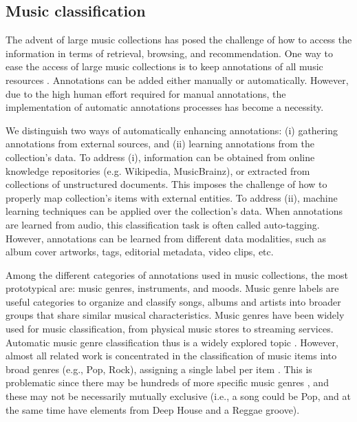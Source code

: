 \subsection{Music classification}
\label{sec:intro:annotation}

The advent of large music collections has posed the challenge of how to access the information in terms of retrieval, browsing, and recommendation. One way to ease the access of large music collections is to keep annotations of all music resources \citep{sordo2012semantic}. Annotations can be added either manually or automatically. 
However, due to the high human effort required for manual annotations, the implementation of automatic annotations processes has become a necessity. 

We distinguish two ways of automatically enhancing annotations: (i) gathering annotations from external sources, and (ii) learning annotations from the collection's data. To address (i), information can be obtained from online knowledge repositories (e.g. Wikipedia, MusicBrainz), or extracted from collections of unstructured documents. This imposes the challenge of how to properly map collection's items with external entities. To address (ii), machine learning techniques can be applied over the collection's data. When annotations are learned from audio, this classification task is often called auto-tagging. However, annotations can be learned from different data modalities, such as album cover artworks, tags, editorial metadata, video clips, etc.

Among the different categories of annotations used in music collections, the most prototypical are: music genres, instruments, and moods. 
Music genre labels are useful categories to organize and classify songs, albums and artists into broader groups that share similar musical characteristics. Music genres have been widely used for music classification, from physical music stores to streaming services. Automatic music genre classification thus is a widely explored topic \citep{sturm2012survey}.
However, almost all related work is concentrated in the classification of music items into broad genres (e.g., Pop, Rock), assigning a single label per item \citep{bogdanov2016cross}. This is problematic since there may be hundreds of more specific music genres \citep{pachet2000taxonomy}, and these may not be necessarily mutually exclusive (i.e., a song could be Pop, and at the same time have elements from Deep House and a Reggae groove). 

